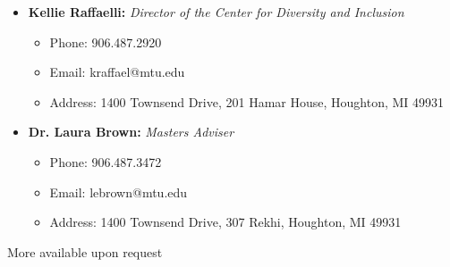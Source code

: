 \documentclass[11pt,a4paper,sans]{moderncv}        %
\begin{document}
\begin{itemize}
\vspace{6pt}

\item{\textbf{Kellie Raffaelli:} \textit{Director of the Center for Diversity and Inclusion}

\vspace{3pt}

\small{
\begin{itemize}
\item Phone: 906.487.2920
\item Email: kraffael@mtu.edu
\item Address: 1400 Townsend Drive, 201 Hamar House, Houghton, MI 49931
\end{itemize}
}}

\vspace{6pt}

\item{\textbf{Dr. Laura Brown:} \textit{Masters Adviser}

\vspace{3pt}

\small{
\begin{itemize}
\item Phone: 906.487.3472
\item Email: lebrown@mtu.edu
\item Address: 1400 Townsend Drive, 307 Rekhi, Houghton, MI 49931
\end{itemize}
}}

\end{itemize}

\vspace{6pt}

More available upon request
\end{document}
